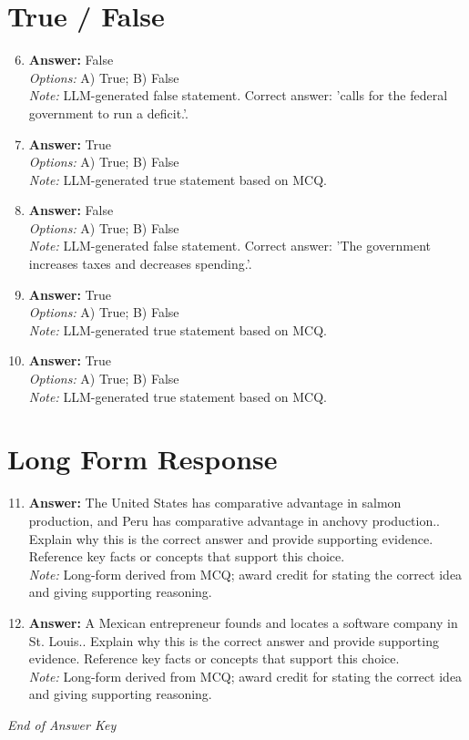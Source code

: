 \documentclass[12pt]{article}
\begin{document}
\section*{True / False}
\begin{enumerate}[label=\arabic*.]
\setcounter{enumi}{5}
\item \textbf{Answer:} False
\\ \textit{Options:} A) True; B) False
\\ \textit{Note:} LLM-generated false statement. Correct answer: 'calls for the federal government to run a deficit.'.
\item \textbf{Answer:} True
\\ \textit{Options:} A) True; B) False
\\ \textit{Note:} LLM-generated true statement based on MCQ.
\item \textbf{Answer:} False
\\ \textit{Options:} A) True; B) False
\\ \textit{Note:} LLM-generated false statement. Correct answer: 'The government increases taxes and decreases spending.'.
\item \textbf{Answer:} True
\\ \textit{Options:} A) True; B) False
\\ \textit{Note:} LLM-generated true statement based on MCQ.
\item \textbf{Answer:} True
\\ \textit{Options:} A) True; B) False
\\ \textit{Note:} LLM-generated true statement based on MCQ.
\end{enumerate}

\section*{Long Form Response}
\begin{enumerate}[label=\arabic*.]
\setcounter{enumi}{10}
\item \textbf{Answer:} The United States has comparative advantage in salmon production, and Peru has comparative advantage in anchovy production.. Explain why this is the correct answer and provide supporting evidence. Reference key facts or concepts that support this choice.
\\ \textit{Note:} Long-form derived from MCQ; award credit for stating the correct idea and giving supporting reasoning.
\item \textbf{Answer:} A Mexican entrepreneur founds and locates a software company in St. Louis.. Explain why this is the correct answer and provide supporting evidence. Reference key facts or concepts that support this choice.
\\ \textit{Note:} Long-form derived from MCQ; award credit for stating the correct idea and giving supporting reasoning.
\end{enumerate}

\vfill
\noindent\textit{End of Answer Key}
\end{document}
